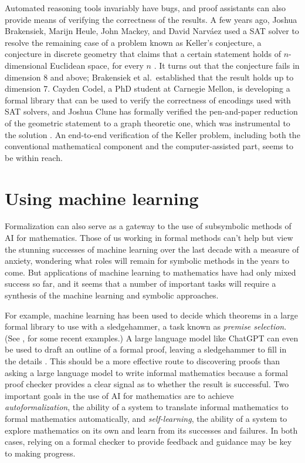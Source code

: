 \documentclass[12pt]{amsart}
\theoremstyle{definition}
\theoremstyle{remark}
\numberwithin{equation}{section}
\begin{document}
Automated reasoning tools invariably have bugs, and proof assistants can also provide means of verifying the correctness of the results. A few years ago, Joshua Brakensiek, Marijn Heule, John Mackey, and David Narv\'aez used a SAT solver to resolve the remaining case of a problem known as Keller's conjecture, a conjecture in discrete geometry that claims that a certain statement holds of $n$-dimensional Euclidean space, for every $n$ \cite{brakensiek:et:al:20}. It turns out that the conjecture fails in dimension 8 and above; Brakensiek et al.~established that the result holds up to dimension 7. Cayden Codel, a PhD student at Carnegie Mellon, is developing a formal library that can be used to verify the correctness of encodings used with SAT solvers, and Joshua Clune has formally verified the pen-and-paper reduction of the geometric statement to a graph theoretic one, which was instrumental to the solution \cite{clune:23}. An end-to-end verification of the Keller problem, including both the conventional mathematical component and the computer-assisted part, seems to be within reach.


\section{Using machine learning}
\label{section:enabling:ai}

Formalization can also serve as a gateway to the use of subsymbolic methods of AI for mathematics. Those of us working in formal methods can't help but view the stunning successes of machine learning over the last decade with a measure of anxiety, wondering what roles will remain for symbolic methods in the years to come. But applications of machine learning to mathematics have had only mixed success so far, and it seems that a number of important tasks will require a synthesis of the machine learning and symbolic approaches.

For example, machine learning has been used to decide which theorems in a large formal library to use with a sledgehammer, a task known as \emph{premise selection}. (See \cite{goertzel:et:al:22,mikula:et:al:23}, for some recent examples.) A large language model like ChatGPT can even be used to draft an outline of a formal proof, leaving a sledgehammer to fill in the details \cite{jiang:et:al:22}. This should be a more effective route to discovering proofs than asking a large language model to write informal mathematics because a formal proof checker provides a clear signal as to whether the result is successful. Two important goals in the use of AI for mathematics are to achieve \emph{autoformalization}, the ability of a system to translate informal mathematics to formal mathematics automatically, and \emph{self-learning}, the ability of a system to explore mathematics on its own and learn from its successes and failures. In both cases, relying on a formal checker to provide feedback and guidance may be key to making progress.
\end{document}
